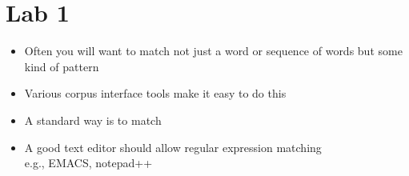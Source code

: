 \documentclass[a4paper,landscape,headrule,footrule,xetex]{foils}
\begin{document}





\section{Lab 1}


\begin{itemize}
\item Often you will want to match not just a word or sequence of
  words but some kind of pattern
\item Various corpus interface tools make it easy to do this
\item A standard way is to match 
\item A good text editor should allow regular expression matching
\\ e.g., EMACS, notepad++
\end{itemize}
\end{document}
